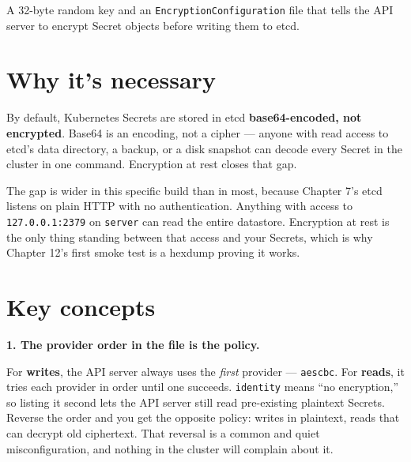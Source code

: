 \documentclass[11pt,oneside]{report}
\begin{document}
A 32-byte random key
and an
\texttt{EncryptionConfiguration}
file that tells the
API server to
encrypt Secret
objects before
writing them to
etcd.

\hypertarget{why-its-necessary-6}{%
\section{Why it's
necessary}\label{why-its-necessary-6}}

\begin{whybox}

By default,
Kubernetes Secrets
are stored in etcd
\textbf{base64-encoded,
not encrypted}.
Base64 is an
encoding, not a
cipher --- anyone
with read access to
etcd's data
directory, a backup,
or a disk snapshot
can decode every
Secret in the
cluster in one
command. Encryption
at rest closes that
gap.

\end{whybox}

The gap is wider in
this specific build
than in most,
because Chapter 7's
etcd listens on
plain HTTP with no
authentication.
Anything with access
to
\texttt{127.0.0.1:2379}
on \texttt{server}
can read the entire
datastore.
Encryption at rest
is the only thing
standing between
that access and your
Secrets, which is
why Chapter 12's
first smoke test is
a hexdump proving it
works.

\hypertarget{key-concepts-6}{%
\section{Key
concepts}\label{key-concepts-6}}

\textbf{1. The
provider order in
the file is the
policy.}


For \textbf{writes},
the API server
always uses the
\emph{first}
provider ---
\texttt{aescbc}. For
\textbf{reads}, it
tries each provider
in order until one
succeeds.
\texttt{identity}
means ``no
encryption,'' so
listing it second
lets the API server
still read
pre-existing
plaintext Secrets.
Reverse the order
and you get the
opposite policy:
writes in plaintext,
reads that can
decrypt old
ciphertext. That
reversal is a common
and quiet
misconfiguration,
and nothing in the
cluster will
complain about it.
\end{document}
